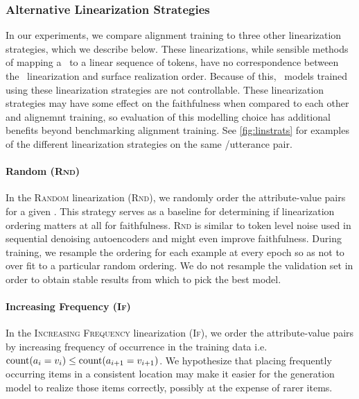 \subsubsection{Alternative Linearization Strategies}

In our experiments, we compare alignment training to three other linearization
strategies, which we describe below.  These linearizations, while sensible
methods of mapping a \meaningrepresentation~to a linear sequence of tokens,
have no correspondence between the \meaningrepresentation~linearization and
surface realization order. Because of this, \sequencetosequence~models trained
using these linearization strategies are not controllable. These linearization
strategies may have some effect on the faithfulness when compared to each other
and alignemnt training, so evaluation of this modelling choice has additional
benefits beyond benchmarking alignment training.  See \autoref{fig:linstrats}
for examples of the different linearization strategies on the same
\meaningrepresentation/utterance pair.

\paragraph{Random (\textsc{Rnd})} In the \textsc{Random} linearization
(\textsc{Rnd}), we randomly order the attribute-value pairs for a given
\meaningrepresentation. This strategy serves as a baseline for determining if
linearization ordering matters at all for faithfulness. \textsc{Rnd} is similar
to token level noise used in sequential denoising autoencoders
\citep{wang2019denoising} and might even improve faithfulness.  During
training, we resample the ordering for each example at every epoch so as not to
over fit to a particular random ordering.  We do not resample the validation
set in order to obtain stable results from which to pick the best model.



\paragraph{Increasing Frequency (\textsc{If})} In the \textsc{Increasing
Frequency} linearization (\textsc{If}), we order the attribute-value pairs by
increasing frequency of occurrence in the training data i.e.
$\operatorname{count}(a_i=v_i) \le \operatorname{count}(a_{i+1}=v_{i+1})$.  We
hypothesize that placing frequently occurring items in a consistent location
may make it easier for the generation model to realize those items correctly,
possibly at the expense of rarer items.

